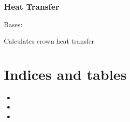\documentclass[letterpaper,10pt,english]{sphinxmanual}
\begin{document}
\subsection{Heat Transfer}
\label{metrics_HeatTransfer::doc}\label{metrics_HeatTransfer:heat-transfer}

\begin{fulllineitems}
\label{metrics_HeatTransfer:metrics.HeatTransfer}
Bases: 

Calculates crown heat transfer

\begin{fulllineitems}
\label{metrics_HeatTransfer:metrics.HeatTransfer.get_tree_files}
\end{fulllineitems}


\begin{fulllineitems}
\label{metrics_HeatTransfer:metrics.HeatTransfer.read_tree_conv}
\end{fulllineitems}


\begin{fulllineitems}
\label{metrics_HeatTransfer:metrics.HeatTransfer.read_tree_rad}
\end{fulllineitems}


\end{fulllineitems}



\chapter{Indices and tables}
\label{index:indices-and-tables}\begin{itemize}
\item {} 

\item {} 

\item {} 

\end{itemize}
\end{document}
